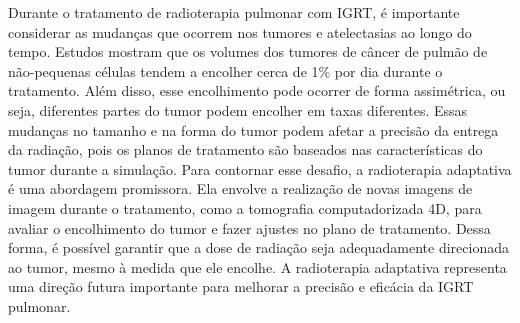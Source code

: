 \documentclass[11pt,a4paper]{article}
\begin{document}
	Durante o tratamento de radioterapia pulmonar com IGRT, é importante considerar as mudanças que ocorrem nos tumores e atelectasias ao longo do tempo. Estudos mostram que os volumes dos tumores de câncer de pulmão de não-pequenas células tendem a encolher cerca de 1\% por dia durante o tratamento. Além disso, esse encolhimento pode ocorrer de forma assimétrica, ou seja, diferentes partes do tumor podem encolher em taxas diferentes. Essas mudanças no tamanho e na forma do tumor podem afetar a precisão da entrega da radiação, pois os planos de tratamento são baseados nas características do tumor durante a simulação. Para contornar esse desafio, a radioterapia adaptativa é uma abordagem promissora. Ela envolve a realização de novas imagens de imagem durante o tratamento, como a tomografia computadorizada 4D, para avaliar o encolhimento do tumor e fazer ajustes no plano de tratamento. Dessa forma, é possível garantir que a dose de radiação seja adequadamente direcionada ao tumor, mesmo à medida que ele encolhe. A radioterapia adaptativa representa uma direção futura importante para melhorar a precisão e eficácia da IGRT pulmonar.


\end{document}
